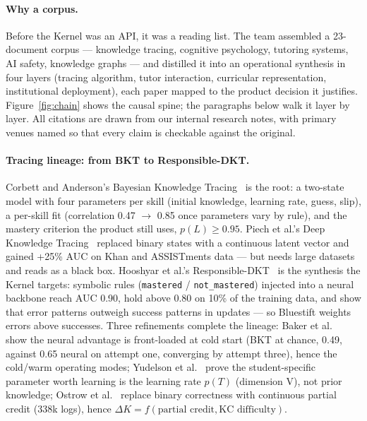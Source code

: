 \documentclass[11pt,a4paper]{article}
\begin{document}
\paragraph{Why a corpus.} Before the Kernel was an API, it was a reading
list. The team assembled a 23-document corpus --- knowledge tracing,
cognitive psychology, tutoring systems, AI safety, knowledge graphs --- and
distilled it into an operational synthesis in four layers (tracing algorithm,
tutor interaction, curricular representation, institutional deployment), each
paper mapped to the product decision it justifies. Figure~\ref{fig:chain}
shows the causal spine; the paragraphs below walk it layer by layer. All
citations are drawn from our internal research notes, with primary venues
named so that every claim is checkable against the original.

\paragraph{Tracing lineage: from BKT to Responsible-DKT.} Corbett and
Anderson's Bayesian Knowledge Tracing~\cite{corbett-1995} is the root: a
two-state model with four parameters per skill (initial knowledge, learning
rate, guess, slip), a per-skill fit (correlation 0.47 $\to$ 0.85 once
parameters vary by rule), and the mastery criterion the product still uses,
$p(L) \geq 0.95$. Piech et al.'s Deep Knowledge Tracing~\cite{piech-2015}
replaced binary states with a continuous latent vector and gained +25\% AUC
on Khan and ASSISTments data --- but needs large datasets and reads as a
black box. Hooshyar et al.'s Responsible-DKT~\cite{hooshyar-2026} is the
synthesis the Kernel targets: symbolic rules (\texttt{mastered} /
\texttt{not\_mastered}) injected into a neural backbone reach AUC 0.90, hold
above 0.80 on 10\% of the training data, and show that error patterns
outweigh success patterns in updates --- so Bluestift weights errors above
successes. Three refinements complete the lineage: Baker et
al.~\cite{das-baker-2021} show the neural advantage is front-loaded at cold
start (BKT at chance, 0.49, against 0.65 neural on attempt one, converging by
attempt three), hence the cold/warm operating modes; Yudelson et
al.~\cite{yudelson-2013} prove the student-specific parameter worth learning
is the learning rate $p(T)$ (dimension V), not prior knowledge; Ostrow et
al.~\cite{ostrow-2015} replace binary correctness with continuous partial
credit (338k logs), hence $\Delta K = f(\text{partial credit}, \text{KC
difficulty})$.
\end{document}
